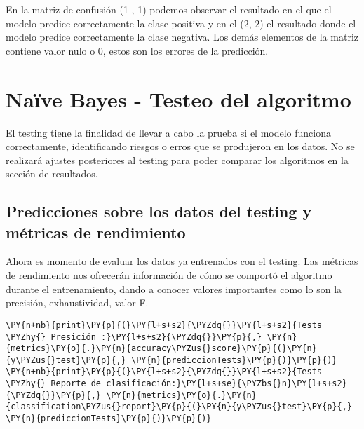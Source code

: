     En la matriz de confusión (1 , 1) podemos observar el resultado en el
que el modelo predice correctamente la clase positiva y en el (2, 2) el
resultado donde el modelo predice correctamente la clase negativa. Los
demás elementos de la matriz contiene valor nulo o 0, estos son los
errores de la predicción.

    \hypertarget{nauxefve-bayes---testeo-del-algoritmo}{%
\section{Naïve Bayes - Testeo del
algoritmo}\label{nauxefve-bayes---testeo-del-algoritmo}}

El testing tiene la finalidad de llevar a cabo la prueba si el modelo
funciona correctamente, identificando riesgos o erros que se produjeron
en los datos. No se realizará ajustes posteriores al testing para poder
comparar los algoritmos en la sección de resultados.

    \hypertarget{predicciones-sobre-los-datos-del-testing-y-muxe9tricas-de-rendimiento}{%
\subsection{Predicciones sobre los datos del testing y métricas de
rendimiento}\label{predicciones-sobre-los-datos-del-testing-y-muxe9tricas-de-rendimiento}}

Ahora es momento de evaluar los datos ya entrenados con el testing. Las
métricas de rendimiento nos ofrecerán información de cómo se comportó el
algoritmo durante el entrenamiento, dando a conocer valores importantes
como lo son la precisión, exhaustividad, valor-F.

    \begin{tcolorbox}[breakable, size=fbox, boxrule=1pt, pad at break*=1mm,colback=cellbackground, colframe=cellborder]
\begin{Verbatim}[commandchars=\\\{\}]
\PY{n+nb}{print}\PY{p}{(}\PY{l+s+s2}{\PYZdq{}}\PY{l+s+s2}{Tests \PYZhy{} Presición :}\PY{l+s+s2}{\PYZdq{}}\PY{p}{,} \PY{n}{metrics}\PY{o}{.}\PY{n}{accuracy\PYZus{}score}\PY{p}{(}\PY{n}{y\PYZus{}test}\PY{p}{,} \PY{n}{prediccionTests}\PY{p}{)}\PY{p}{)}
\PY{n+nb}{print}\PY{p}{(}\PY{l+s+s2}{\PYZdq{}}\PY{l+s+s2}{Tests \PYZhy{} Reporte de clasificación:}\PY{l+s+se}{\PYZbs{}n}\PY{l+s+s2}{\PYZdq{}}\PY{p}{,} \PY{n}{metrics}\PY{o}{.}\PY{n}{classification\PYZus{}report}\PY{p}{(}\PY{n}{y\PYZus{}test}\PY{p}{,} \PY{n}{prediccionTests}\PY{p}{)}\PY{p}{)}
\end{Verbatim}
\end{tcolorbox}

